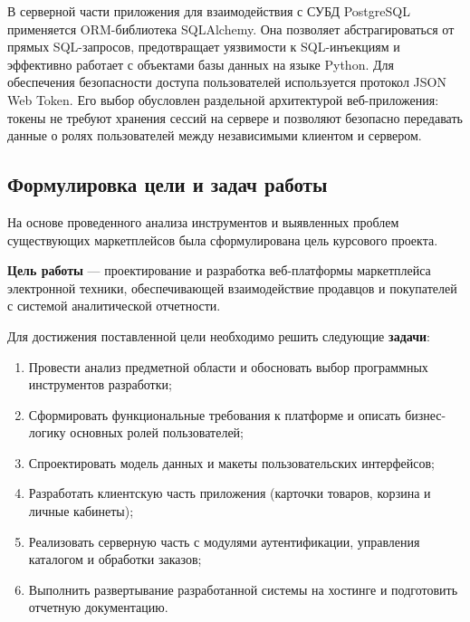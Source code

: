 В серверной части приложения для взаимодействия с СУБД PostgreSQL применяется ORM-библиотека SQLAlchemy. Она позволяет абстрагироваться 
от прямых SQL-запросов, предотвращает уязвимости к SQL-инъекциям и эффективно работает с объектами базы данных на языке Python. Для обеспечения безопасности доступа пользователей используется протокол JSON Web Token. Его 
выбор обусловлен раздельной архитектурой веб-приложения: токены не требуют хранения сессий на сервере и позволяют безопасно передавать данные о ролях пользователей между независимыми клиентом и сервером.

\subsection{Формулировка цели и задач работы}

На основе проведенного анализа инструментов и выявленных проблем существующих маркетплейсов была сформулирована цель курсового проекта.

\textbf{Цель работы} --- проектирование и разработка веб-платформы маркетплейса электронной техники, обеспечивающей взаимодействие 
продавцов и покупателей с системой аналитической отчетности.


Для достижения поставленной цели необходимо решить следующие \textbf{задачи}:
\begin{enumerate}
    \item Провести анализ предметной области и обосновать выбор программных инструментов разработки;
    \item Сформировать функциональные требования к платформе и описать бизнес-логику основных ролей пользователей;
    \item Спроектировать модель данных и макеты пользовательских интерфейсов;
    \item Разработать клиентскую часть приложения (карточки товаров, корзина и личные кабинеты);
    \item Реализовать серверную часть с модулями аутентификации, управления каталогом и обработки заказов;
    \item Выполнить развертывание разработанной системы на хостинге и подготовить отчетную документацию.
\end{enumerate}